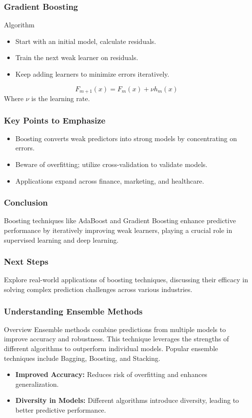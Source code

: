 \documentclass[aspectratio=169]{beamer}
\begin{document}
\begin{frame}[fragile]
    \frametitle{Gradient Boosting}
    \begin{block}{Algorithm}
        \begin{itemize}
            \item Start with an initial model, calculate residuals.
            \item Train the next weak learner on residuals.
            \item Keep adding learners to minimize errors iteratively.
        \end{itemize}
    \end{block}
    \begin{equation}
        F_{m+1}(x) = F_m(x) + \nu h_m(x)
    \end{equation}
    Where \( \nu \) is the learning rate.
\end{frame}

\begin{frame}[fragile]
    \frametitle{Key Points to Emphasize}
    \begin{itemize}
        \item Boosting converts weak predictors into strong models by concentrating on errors.
        \item Beware of overfitting; utilize cross-validation to validate models.
        \item Applications expand across finance, marketing, and healthcare.
    \end{itemize}
\end{frame}

\begin{frame}[fragile]
    \frametitle{Conclusion}
    Boosting techniques like AdaBoost and Gradient Boosting enhance predictive performance by iteratively improving weak learners, playing a crucial role in supervised learning and deep learning.
\end{frame}

\begin{frame}[fragile]
    \frametitle{Next Steps}
    Explore real-world applications of boosting techniques, discussing their efficacy in solving complex prediction challenges across various industries.
\end{frame}

\begin{frame}[fragile]
    \frametitle{Understanding Ensemble Methods}
    \begin{block}{Overview}
        Ensemble methods combine predictions from multiple models to improve accuracy and robustness. This technique leverages the strengths of different algorithms to outperform individual models. Popular ensemble techniques include Bagging, Boosting, and Stacking.
    \end{block}
    \begin{itemize}
        \item \textbf{Improved Accuracy:} Reduces risk of overfitting and enhances generalization.
        \item \textbf{Diversity in Models:} Different algorithms introduce diversity, leading to better predictive performance.
    \end{itemize}
\end{frame}
\end{document}
